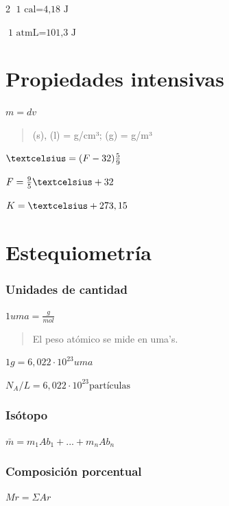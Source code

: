 \begin {multicols}{2}
\(\text{1 cal}=\text{4,18 J}\)

\(\text{1 atmL}=\text{101,3 J}\)

\hypertarget{propiedades-intensivas}{%
\section{Propiedades intensivas}\label{propiedades-intensivas}}

\(m=dv\)

\begin{quote}
(s), (l) = g/cm³; (g) = g/m³
\end{quote}

\(\textcelsius=(F-32)\frac{5}{9}\)

\(F=\frac{9}{5}\textcelsius+32\)

\(K=\textcelsius+273,15\)

\hypertarget{estequiometruxeda}{%
\section{Estequiometría}\label{estequiometruxeda}}

\hypertarget{unidades-de-cantidad}{%
\subsubsection{Unidades de cantidad}\label{unidades-de-cantidad}}

\(1uma=\frac{g}{mol}\)

\begin{quote}
El peso atómico se mide en uma's.
\end{quote}

\(1g=6,022{\cdot}10^{23}uma\)

\(N_{A}/L=6,022{\cdot}10^{23}\text{partículas}\)

\hypertarget{isuxf3topo}{%
\subsubsection{Isótopo}\label{isuxf3topo}}

\(\bar{m}=m_{1}Ab_{1}+...+m_{n}Ab_{n}\)

\hypertarget{composiciuxf3n-porcentual}{%
\subsubsection{Composición porcentual}\label{composiciuxf3n-porcentual}}

\(Mr={\Sigma}Ar\)


\end{multicols}
